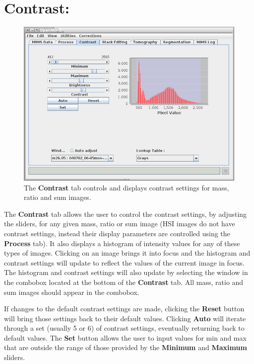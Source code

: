 \documentclass{article}
\begin{document}
\newpage
\section*{Contrast:}
	
	\begin{figure}[h]
	\centering
	\includegraphics[scale=0.70]{snapshot_MimsContrast.png}
	\caption{The \textbf{Contrast} tab controls and displays contrast settings for mass, ratio and sum images.}
	\end{figure}
	
	The \textbf{Contrast} tab allows the user to control the contrast settings, by adjusting 
	the sliders, for any given mass,
	ratio or sum image (HSI images do not have contrast settings, instead their display
	parameters are controlled using the \textbf{Process} tab).
	It also displays a histogram of intensity values for any of these types of images.
	Clicking on an image brings it into focus and the histogram and
	contrast settings will update to reflect the values of the current image in focus.
	The histogram and contrast settings will also update by selecting the window in the
	combobox located at the bottom of the \textbf{Contrast} tab. All mass, ratio and sum images
	should appear in the combobox.

	If changes to the default contrast settings are made, clicking the \textbf{Reset} button will
	bring those settings back to their default values. Clicking \textbf{Auto} will
	iterate through a set (usually 5 or 6) of contrast settings, eventually returning
	back to default values. The \textbf{Set} button allows the user to input values for min and
	max that are outside the range of those provided by the \textbf{Minimum} 
	and \textbf{Maximum} sliders.
\end{document}
